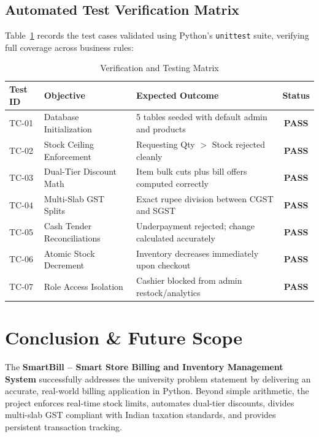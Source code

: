 \documentclass[12pt,a4paper]{article}
\begin{document}
\subsection{Automated Test Verification Matrix}
Table~\ref{tab:testing} records the test cases validated using Python's \texttt{unittest} suite, verifying full coverage across business rules:

\begin{table}[htbp]
    \centering
    \caption{Verification and Testing Matrix}
    \label{tab:testing}
    \begin{tabularx}{\textwidth}{l p{4.5cm} X c}
        \toprule
        \textbf{Test ID} & \textbf{Objective} & \textbf{Expected Outcome} & \textbf{Status} \\
        \midrule
        TC-01 & Database Initialization & 5 tables seeded with default admin and products & \textcolor{codegreen}{\textbf{PASS}} \\
        TC-02 & Stock Ceiling Enforcement & Requesting Qty $>$ Stock rejected cleanly & \textcolor{codegreen}{\textbf{PASS}} \\
        TC-03 & Dual-Tier Discount Math & Item bulk cuts plus bill offers computed correctly & \textcolor{codegreen}{\textbf{PASS}} \\
        TC-04 & Multi-Slab GST Splits & Exact rupee division between CGST and SGST & \textcolor{codegreen}{\textbf{PASS}} \\
        TC-05 & Cash Tender Reconciliations & Underpayment rejected; change calculated accurately & \textcolor{codegreen}{\textbf{PASS}} \\
        TC-06 & Atomic Stock Decrement & Inventory decreases immediately upon checkout & \textcolor{codegreen}{\textbf{PASS}} \\
        TC-07 & Role Access Isolation & Cashier blocked from admin restock/analytics & \textcolor{codegreen}{\textbf{PASS}} \\
        \bottomrule
    \end{tabularx}
\end{table}

\section{Conclusion \& Future Scope}
The \textbf{SmartBill -- Smart Store Billing and Inventory Management System} successfully addresses the university problem statement by delivering an accurate, real-world billing application in Python. Beyond simple arithmetic, the project enforces real-time stock limits, automates dual-tier discounts, divides multi-slab GST compliant with Indian taxation standards, and provides persistent transaction tracking.
\end{document}
